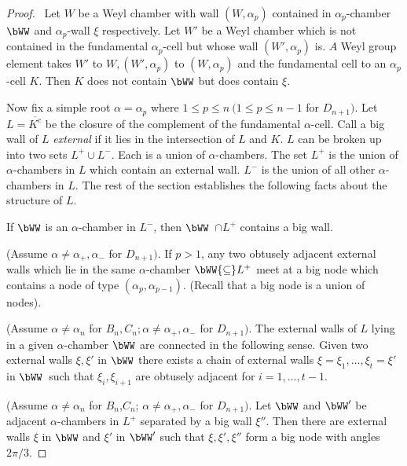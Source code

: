 \documentclass{memo-l}
\theoremstyle{definition}
\theoremstyle{remark}
\numberwithin{section}{chapter}
\numberwithin{equation}{chapter}
\begin{document}
\begin{proof} \ Let $W$ be a Weyl chamber with wall $(W,{\alpha}_{p})$
contained in ${\alpha}_{p}$-chamber $\bWW$ and ${\alpha}_{p}$-wall
${\xi}$ respectively.  Let $W'$ be a Weyl chamber which is not contained in
the fundamental ${\alpha}_{p}$-cell but whose wall $(W',{\alpha}_{p})$ is.
$A$ Weyl group element takes $W'$ to $W, (W',{\alpha}_{p})$ to
$(W,{\alpha}_{p})$ and the fundamental cell to an ${\alpha}_{p}$-cell $K$.
Then $K$ does not contain $\bWW$ but does contain ${\xi}$.

{\medskip}

   Now fix a simple root ${\alpha} = {\alpha}_{p}$ where $1 \le p \le n
\ (1 \le p \le n-1$ for $D_{n+1})$.  Let $L = \overline{K^{c}}$ be the closure
of the complement of the fundamental ${\alpha}$-cell.  Call a big wall of
$L$ {\it external} if it lies in the intersection of $L$ and $K$.  $L$ can
be broken up into two sets $L^{+} \cup L^{-}$.  Each is a
union of ${\alpha}$-chambers.  The set $L^{+}$ is the union of
${\alpha}$-chambers in $L$ which contain an external wall.  $L^-$ is the
union of all other ${\alpha}$-chambers in $L$.  The rest of the section
establishes the following facts about the structure of $L$.
 
 If $\bWW$ is an ${\alpha}$-chamber in
$L^-$, then $\bWW$\ $ \cap  L^{+}$ contains a big wall.
\enddefinition


   (Assume ${\alpha}\ne {\alpha}_{+},{\alpha}_{-}$ for
$D_{n+1})$.  If $p > 1$, any two obtusely adjacent external walls which lie
in the same ${\alpha}$-chamber $\bWW{\subseteq} L^{+}$ meet at a big
node which contains a node of type $({\alpha}_{p},{\alpha}_{p-1})$.
(Recall that a big node is a union of nodes).
\enddefinition

  (Assume $\alpha\ne\alpha_n$ for $B_{n},C_{n}; {\alpha} \ne
{\alpha}_{+},{\alpha}_{-}$ for $D_{n+1})$.  The external walls of $L$ lying
in a given ${\alpha}$-chamber $\bWW$ are connected in the following
sense.  Given two external walls ${\xi},{\xi}'$ in $\bWW$ there exists a
chain of external walls ${\xi} = {\xi}_{1},\ldots ,{\xi}_{t} = {\xi}'$ in 
$\bWW$\  such that ${\xi}_{i},{\xi}_{i+1}$ are obtusely adjacent 
for $i = 1,\ldots ,t-1$.
\enddefinition


 (Assume $\alpha\ne\alpha_n$ for $B_n$,$C_n$;
${\alpha}\ne {\alpha}_{+},{\alpha}_{-}$ for
$D_{n+1})$.  Let $\bWW$ and $\bWW'$ be adjacent ${\alpha}$-chambers
in $L^{+}$ separated by a big wall ${\xi''}$.  Then there are external walls
${\xi}$ in $\bWW$ and ${\xi}'$ in $\bWW'$ such that
${\xi},{\xi}',{\xi''}$ form a big node with angles $2{\pi}/3$.
\enddefinition


\end{proof}
\end{document}

